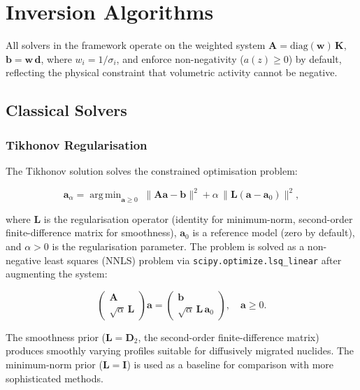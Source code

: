 \documentclass[a4paper,11pt]{article}
\DeclareMathOperator*{\argmin}{arg\,min}
\begin{document}
\section{Inversion Algorithms}\label{sec:solvers}

All solvers in the framework operate on the weighted system
$\bm{A} = \mathrm{diag}(\bm{w})\,\bm{K}$, $\bm{b} = \bm{w}\,\bm{d}$,
where $w_i = 1/\sigma_i$, and enforce non-negativity ($a(z) \geq 0$) by
default, reflecting the physical constraint that volumetric activity
cannot be negative.

\subsection{Classical Solvers}

\subsubsection{Tikhonov Regularisation}

The Tikhonov solution solves the constrained optimisation problem:

\begin{equation}\label{eq:tikhonov}
  \bm{a}_\alpha = \argmin_{\bm{a} \geq 0}\;
    \|\bm{A}\bm{a} - \bm{b}\|^2 + \alpha\,\|\bm{L}(\bm{a} - \bm{a}_0)\|^2,
\end{equation}

where $\bm{L}$ is the regularisation operator (identity for minimum-norm,
second-order finite-difference matrix for smoothness), $\bm{a}_0$ is a
reference model (zero by default), and $\alpha > 0$ is the regularisation
parameter.  The problem is solved as a non-negative least squares (NNLS)
problem via \texttt{scipy.optimize.lsq\_linear} after augmenting the system:

\begin{equation}
  \begin{pmatrix} \bm{A} \\ \sqrt{\alpha}\,\bm{L} \end{pmatrix}
  \bm{a} = \begin{pmatrix} \bm{b} \\ \sqrt{\alpha}\,\bm{L}\,\bm{a}_0 \end{pmatrix},
  \quad \bm{a} \geq 0.
\end{equation}

The smoothness prior ($\bm{L} = \bm{D}_2$, the second-order finite-difference
matrix) produces smoothly varying profiles suitable for diffusively
migrated nuclides.  The minimum-norm prior ($\bm{L} = \bm{I}$) is used as
a baseline for comparison with more sophisticated methods.
\end{document}
